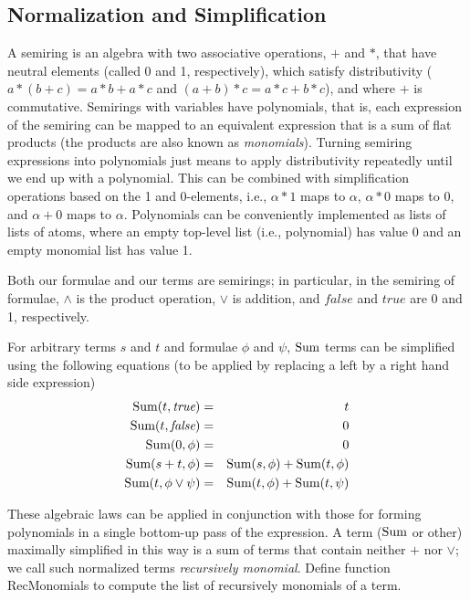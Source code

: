 \subsection{Normalization and Simplification}


A semiring is an algebra with two associative operations,
$+$ and $*$, that
have neutral elements (called 0 and 1, respectively), which satisfy
distributivity ($a*(b+c)= a*b + a*c$ and $(a+b)*c = a*c + b*c$),
and where $+$ is commutative.
Semirings with variables
have polynomials, that is, each expression of the
semiring can be mapped to an equivalent expression that is
a sum of flat products (the products are also known as {\em monomials}\/).
Turning semiring expressions into polynomials just means to apply
distributivity repeatedly until we end up with a polynomial.
This can be combined with simplification operations based on the 1 and
0-elements, i.e., $\alpha * 1$ maps to $\alpha$, $\alpha*0$ maps to $0$, and
$\alpha+0$ maps to $\alpha$. Polynomials can be conveniently implemented
as lists of lists of atoms, where an empty top-level list (i.e., polynomial)
has value 0 and an empty monomial list has value 1.

Both our formulae and our terms are semirings; in particular,
in the semiring of formulae, $\land$ is the product operation,
$\lor$ is addition,
and $\textit{false}$ and $\textit{true}$ are 0 and 1, respectively.

For arbitrary terms $s$ and $t$ and formulae $\phi$ and $\psi$,
$\mbox{Sum}$ terms can be simplified using the following equations (to be
applied by replacing a left by a right hand side expression)
\begin{eqnarray*}
\mbox{Sum}(t, \textit{true}) &=& t \\
\mbox{Sum}(t, \textit{false}) &=& 0 \\
\mbox{Sum}(0, \phi) &=& 0 \\
\mbox{Sum}(s+t, \phi) &=& \mbox{Sum}(s, \phi) + \mbox{Sum}(t, \phi) \\
\mbox{Sum}(t, \phi \lor \psi) &=& \mbox{Sum}(t, \phi) + \mbox{Sum}(t, \psi)
\end{eqnarray*}

These algebraic laws can be applied in conjunction with those for forming
polynomials in a single bottom-up pass of the expression.
A term ($\mbox{Sum}$ or other) maximally simplified in this way
is a sum of terms that contain neither $+$ nor $\lor$; we call such 
normalized terms {\em recursively monomial}.
Define function RecMonomials to compute the list of recursively monomials
of a term.

